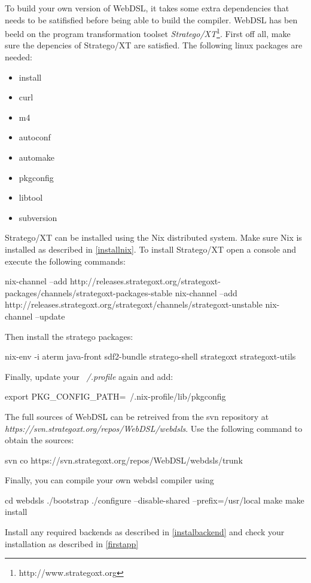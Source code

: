 To build your own version of WebDSL, it takes some extra dependencies that needs to be satifisfied before being able to build the compiler. WebDSL has ben beeld on the program transformation toolset \emph{Stratego/XT}\footnote{http://www.strategoxt.org}. First off all, make sure the depencies of Stratego/XT are satisfied. The following linux packages are needed:
\begin{itemize}
	\item install 
	\item curl 
	\item m4 
	\item autoconf 
	\item automake 
	\item pkgconfig 
	\item libtool 
	\item subversion
\end{itemize}

Stratego/XT can be installed using the Nix distributed system. Make sure Nix is installed as described in \ref{installnix}. To install Stratego/XT open a console and execute the following commands:
\begin{shell}
nix-channel --add http://releases.strategoxt.org/strategoxt-packages/channels/strategoxt-packages-stable
nix-channel --add http://releases.strategoxt.org/strategoxt/channels/strategoxt-unstable
nix-channel --update
\end{shell}
Then install the stratego packages:
\begin{shell}
nix-env -i aterm java-front sdf2-bundle stratego-shell strategoxt strategoxt-utils
\end{shell}
Finally, update your \emph{~/.profile} again and add:
\begin{shell}
export PKG_CONFIG_PATH=~/.nix-profile/lib/pkgconfig
\end{shell}

The full sources of WebDSL can be retreived from the svn repository at \emph{ https://svn.strategoxt.org/repos/WebDSL/webdsls}. Use the following command to obtain the sources:
\begin{shell}
svn co  https://svn.strategoxt.org/repos/WebDSL/webdsls/trunk
\end{shell}
Finally, you can compile your own webdsl compiler using 
\begin{shell}
cd webdsls
./bootstrap
./configure --disable-shared --prefix=/usr/local
make
make install
\end{shell}
Install any required backends as described in \ref{instalbackend} and check your installation as described in \ref{firstapp}

